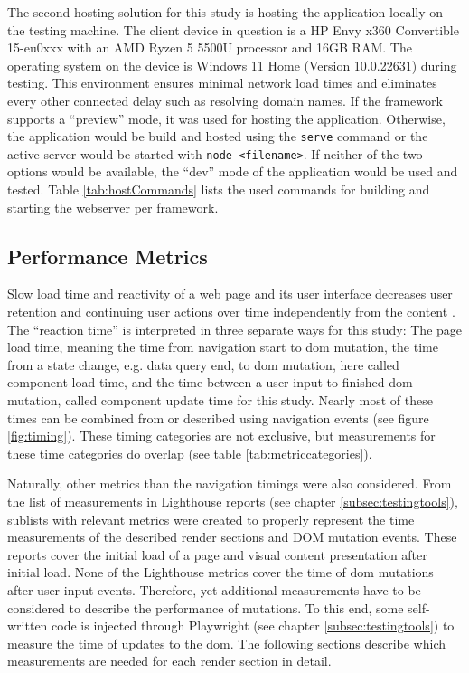 \documentclass[a4paper, 12pt]{article}
\begin{document}
The second hosting solution for this study is hosting the application locally on the testing machine.
The client device in question is a HP Envy x360 Convertible 15-eu0xxx with an AMD Ryzen 5 5500U processor and 16GB RAM.
The operating system on the device is Windows 11 Home (Version 10.0.22631) during testing.
This environment ensures minimal network load times and eliminates every other connected delay such as resolving domain names.
If the framework supports a \enquote{preview} mode, it was used for hosting the application.
Otherwise, the application would be build and hosted using the \verb|serve| command or the active server would be started with \verb|node <filename>|.
If neither of the two options would be available, the \enquote{dev} mode of the application would be used and tested.
Table \ref{tab:hostCommands} lists the used commands for building and starting the webserver per framework.

\subsection{Performance Metrics}\label{subsec:performancemetrics}
% 

Slow load time and reactivity of a web page and its user interface decreases user retention and continuing user actions over time independently from the content \citep{webprophet,effectsofwebpagecontents}.
The \enquote{reaction time} is interpreted in three separate ways for this study: The page load time, meaning the time from navigation start to \acrshort{dom} mutation, the time from a state change, e.g. data query end, to \acrshort{dom} mutation, here called component load time, and the time between a user input to finished \acrshort{dom} mutation, called component update time for this study.
Nearly most of these times can be combined from or described using navigation events (see figure \ref{fig:timing}).
These timing categories are not exclusive, but measurements for these time categories do overlap (see table \ref{tab:metriccategories}).

Naturally, other metrics than the navigation timings were also considered.
From the list of measurements in Lighthouse reports (see chapter \ref{subsec:testingtools}), sublists with relevant metrics were created to properly represent the time measurements of the described render sections and DOM mutation events.
These reports cover the initial load of a page and visual content presentation after initial load.
None of the Lighthouse metrics cover the time of \acrshort{dom} mutations after user input events.
Therefore, yet additional measurements have to be considered to describe the performance of mutations.
To this end, some self-written code is injected through Playwright (see chapter \ref{subsec:testingtools}) to measure the time of updates to the \acrshort{dom}.
The following sections describe which measurements are needed for each render section in detail.
\end{document}

